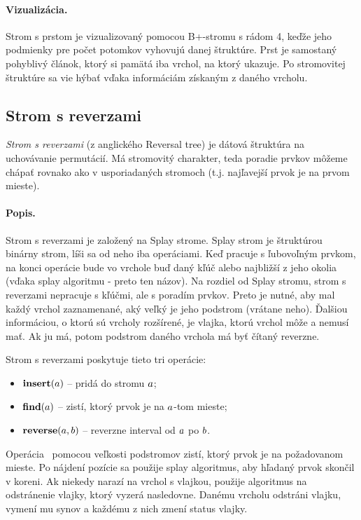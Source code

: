 \paragraph{Vizualizácia.}
Strom s prstom je vizualizovaný pomocou B+-stromu s rádom 4, keďže jeho podmienky pre počet potomkov vyhovujú danej štruktúre. Prst je samostaný pohyblivý článok, ktorý si pamätá iba vrchol, na ktorý ukazuje. Po stromovitej štruktúre sa vie hýbať vďaka informáciám získaným z daného vrcholu.

\subsection{Strom s reverzami}
\emph{Strom s reverzami} (z anglického Reversal tree) je dátová štruktúra na uchovávanie permutácií. Má stromovitý charakter, teda poradie prvkov môžeme chápať rovnako ako v usporiadaných stromoch (t.j. najľavejší prvok je na prvom mieste).

\paragraph{Popis.}
Strom s reverzami je založený na Splay strome\citet{kuko}. Splay strom je štruktúrou binárny strom, líši sa od neho iba operáciami. Keď pracuje s ľubovoľným prvkom, na konci operácie bude vo vrchole buď daný kľúč alebo najbližší z jeho okolia (vďaka splay algoritmu - preto ten názov). Na rozdiel od Splay stromu, strom s reverzami nepracuje s kľúčmi, ale s poradím prvkov. Preto je nutné, aby mal každý vrchol zaznamenané, aký veľký je jeho podstrom (vrátane neho). Ďalšiou informáciou, o ktorú sú vrcholy rozšírené, je vlajka, ktorú vrchol môže a nemusí mať. Ak ju má, potom podstrom daného vrchola má byť čítaný reverzne.

Strom s reverzami poskytuje tieto tri operácie:
\begin{itemize}
\item $\mathop{\mathbf{insert}}(a)$ -- pridá do stromu $a$;
\item $\mathop{\mathbf{find}}(a)$ -- zistí, ktorý prvok je na $a$-tom mieste;
\item $\mathop{\mathbf{reverse}}(a,b)$ -- reverzne interval od $a$ po $b$.
\end{itemize}

Operácia \find\ pomocou veľkosti podstromov zistí, ktorý prvok je na požadovanom mieste. Po nájdení pozície sa použije splay algoritmus, aby hľadaný prvok skončil v koreni. Ak niekedy narazí na vrchol s vlajkou, použije algoritmus na odstránenie vlajky, ktorý vyzerá nasledovne. Danému vrcholu odstráni vlajku, vymení mu synov a každému z nich zmení status vlajky.

